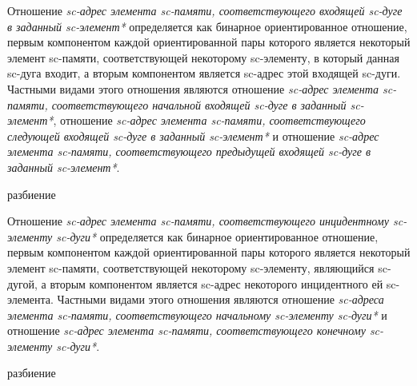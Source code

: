 Отношение \textit{sc-адрес элемента sc-памяти, соответствующего входящей sc-дуге в заданный sc-элемент*} определяется как бинарное ориентированное отношение, первым компонентом каждой ориентированной пары которого является некоторый элемент sc-памяти, соответствующей некоторому sc-элементу, в который данная sc-дуга входит, а вторым компонентом является sc-адрес этой входящей sc-дуги. Частными видами этого отношения являются отношение \textit{sc-адрес элемента sc-памяти, соответствующего начальной входящей sc-дуге в заданный sc-элемент*}, отношение \textit{sc-адрес элемента sc-памяти, соответствующего следующей входящей sc-дуге в заданный sc-элемент*} и отношение \textit{sc-адрес элемента sc-памяти, соответствующего предыдущей входящей sc-дуге в заданный sc-элемент*}.

\begin{SCn}
\begin{scnrelfromset}{разбиение}
\end{scnrelfromset}
\end{SCn}

Отношение \textit{sc-адрес элемента sc-памяти, соответствующего инцидентному sc-элементу sc-дуги*} определяется как бинарное ориентированное отношение, первым компонентом каждой ориентированной пары которого является некоторый элемент sc-памяти, соответствующей некоторому sc-элементу, являющийся sc-дугой, а вторым компонентом является sc-адрес некоторого инцидентного ей sc-элемента. Частными видами этого отношения являются отношение \textit{sc-адреса элемента sc-памяти, соответствующего начальному sc-элементу sc-дуги*} и отношение \textit{sc-адрес элемента sc-памяти, соответствующего конечному sc-элементу sc-дуги*}.

\begin{SCn}
\begin{scnrelfromset}{разбиение}
\end{scnrelfromset}
\end{SCn}

